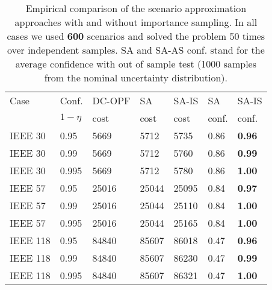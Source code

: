 \documentclass{IEEEtran4PSCC}
\begin{document}

\begin{table}[ht]
  \centering
  \begin{tabular}{lllllll}
    \toprule
    Case & Conf.  & DC-OPF & SA & SA-IS & SA & SA-IS\\
       & $1-\eta$ & cost & cost & cost & conf. & conf.\\
    \midrule
    IEEE 30 & 0.95 & 5669 & 5712 & 5735 & 0.86 & \textbf{0.96}\\
    IEEE 30 & 0.99 & 5669 & 5712 & 5760 & 0.86 & \textbf{0.99} \\ 
    IEEE 30 & 0.995 & 5669 & 5712 & 5780 & 0.86 & \textbf{1.00}\\
    \hline
    IEEE 57 & 0.95 & 25016 & 25044 & 25095 & 0.84 & \textbf{0.97}\\
    IEEE 57 & 0.99 & 25016 & 25044 & 25110 & 0.84 & \textbf{1.00}\\ 
    IEEE 57 & 0.995 & 25016 & 25044 & 25165 & 0.84 & \textbf{1.00}\\
    \hline
    IEEE 118 & 0.95 & 84840 & 85607 & 86018 & 0.47 & \textbf{0.96}\\
    IEEE 118 & 0.99 & 84840 & 85607 & 86230 & 0.47 & \textbf{0.99}\\
    IEEE 118 & 0.995 & 84840 & 85607 & 86321 & 0.47 & \textbf{1.00}\\
    \bottomrule
  \end{tabular}
  \caption{Empirical comparison of the scenario approximation approaches with and without importance sampling. In all cases we used \textbf{600} scenarios and solved the problem 50 times over independent samples. SA and SA-AS conf. stand for the average confidence with out of sample test (1000 samples from the nominal uncertainty distribution). }
  \label{tab:emp-ev}
  \vspace{-4mm}
\end{table}

\end{document}
